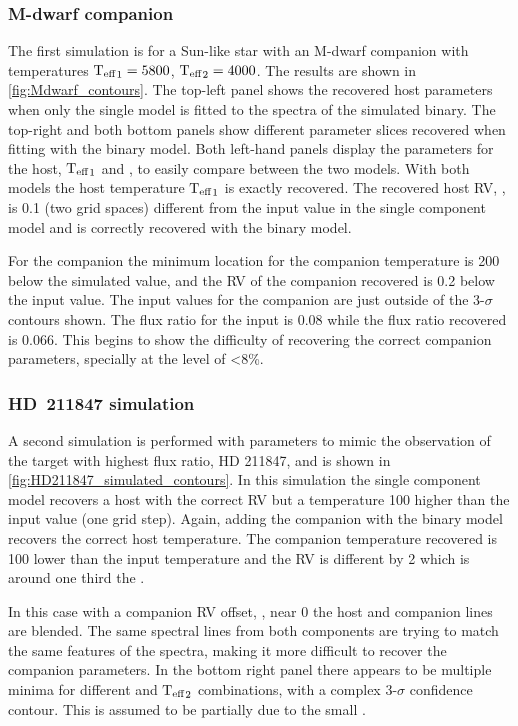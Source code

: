 \subsubsection*{M-dwarf companion}
The first simulation is for a Sun-like star with an M-dwarf companion with temperatures \({\textrm{T}_{\mathrm{eff}}}_{1} = 5800\)\K{}, \({\textrm{T}_{\mathrm{eff}}}_{2} = 4000\)\K{}.
The results are shown in \cref{fig:Mdwarf_contours}.
The top-left panel shows the recovered host parameters when only the single model is fitted to the spectra of the simulated binary.
The top-right and both bottom panels show different parameter slices recovered when fitting with the binary model.
Both left-hand panels display the parameters for the host, \({\textrm{T}_{\mathrm{eff}}}_{1}\) and \Rvone{}, to easily compare between the two models.
With both models the host temperature \({\textrm{T}_{\mathrm{eff}}}_{1}\) is exactly recovered.
The recovered host {RV}, \Rvone{}, is 0.1\kmps{} (two grid spaces) different from the input value in the single component model and is correctly recovered with the binary model.

For the companion the minimum \textchisquared{} location for the companion temperature is 200\K{} below the simulated value, and the {RV} of the companion recovered is 0.2\kmps{} below the input value.
The input values for the companion are just outside of the 3-\(\sigma\) contours shown.
The flux ratio for the input is 0.08 while the flux ratio recovered is 0.066.
This begins to show the difficulty of recovering the correct companion parameters, specially at the level of \FtwoFone<8\%.

\subsubsection*{{HD~211847} simulation}
A second simulation is performed with parameters to mimic the observation of the target with highest flux ratio, {HD 211847}, and is shown in \cref{fig:HD211847_simulated_contours}.
In this simulation the single component model recovers a host with the correct {RV} but a temperature 100\K{} higher than the input value (one grid step).
Again, adding the companion with the binary model recovers the correct host temperature.
The companion temperature recovered is 100\K{} lower than the input temperature and the {RV} is different by 2\kmps{} which is around one third the {\fwhm}.

In this case with a companion {RV} offset, \Rvtwo{}, near 0\kmps{} the host and companion lines are blended.
The same spectral lines from both components are trying to match the same features of the spectra, making it more difficult to recover the companion parameters.
In the bottom right panel there appears to be multiple minima for different \Rvtwo{} and \({\textrm{T}_{\mathrm{eff}}}_{2}\) combinations, with a complex 3-\(\sigma\) confidence contour.
This is assumed to be partially due to the small \Rvtwo{}.

